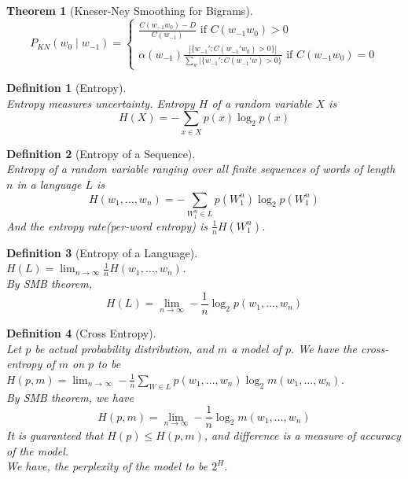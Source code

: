 \documentclass[12pt]{article}
\newtheorem{definition}{Definition}[section]
\newtheorem{theorem}{Theorem}[section]
\theoremstyle{definition}
\begin{document}
\begin{theorem}[Kneser-Ney Smoothing for Bigrams]
\[
P_{KN}(w_0\mid w_{-1})=\begin{cases}
\frac{C(w_{-1}w_0)-D}{C(w_{-1})}\text{ if }C(w_{-1}w_0)>0\\
\alpha(w_{-1})\frac{|\{w_{-1}': C(w_{-1}'w_0)>0\}|}{\sum_{w}|\{w_{-1}':C(w_{-1}'w)>0\}}\text{ if }C(w_{-1}w_0)=0
\end{cases}
\]
\end{theorem}
\begin{definition}[Entropy]
\hfill\\\normalfont Entropy measures uncertainty. Entropy $H$ of a random variable $X$ is
\[
H(X)=-\sum_{x\in X} p(x)\log_2p(x)
\]
\end{definition}
\begin{definition}[Entropy of a Sequence]
\hfill\\\normalfont Entropy of a random variable ranging over all finite sequences of words of length $n$ in a language $L$ is
\[
H(w_1,\ldots, w_n)=-\sum_{W_1^n\in L}p(W_1^n)\log_2p(W_1^n)
\]
And the entropy rate(per-word entropy) is $\frac{1}{n}H(W_1^n)$.
\end{definition}
\begin{definition}[Entropy of a Language]
\hfill\\\normalfont $H(L)=\lim_{n\to\infty} \frac{1}{n}H(w_1,\ldots, w_n)$.\\
By SMB theorem,
\[
H(L)=\lim_{n\to\infty}-\frac{1}{n}\log_2 p(w_1,\ldots, w_n)
\]
\end{definition}
\begin{definition}[Cross Entropy]
\hfill\\\normalfont Let $p$ be actual probability distribution, and $m$ a model of $p$. We have the cross-entropy of $m$ on $p$ to be $H(p,m) = \lim_{n\to\infty}-\frac{1}{n}\sum_{W\in L}p(w_1,\ldots, w_n)\log_2m(w_1,\ldots, w_n)$.\\
By SMB theorem, we have
\[
H(p,m)=\lim_{n\to\infty	}-\frac{1}{n}\log_2 m(w_1,\ldots,w_n)
\]
It is guaranteed that $H(p)\leq H(p,m)$, and difference is a measure of accuracy of the model.\\
We have, the perplexity of the model to be $2^H$.
\end{definition}
\clearpage
\end{document}
